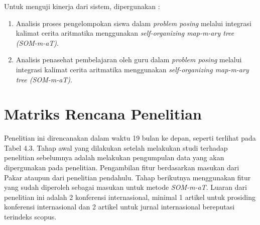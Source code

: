 Untuk menguji kinerja dari sistem, dipergunakan :

\begin{enumerate}
    \item Analisis proses pengelompokan siswa dalam \textit{problem posing} melalui integrasi kalimat cerita aritmatika menggunakan \textit{self-organizing map-m-ary tree (SOM-m-aT)}.
    \item Analisis penasehat pembelajaran oleh guru dalam \textit{problem posing} melalui integrasi kalimat cerita aritmatika menggunakan \textit{self-organizing map-m-ary tree (SOM-m-aT)}.
\end{enumerate}

\section{Matriks Rencana Penelitian}

Penelitian ini direncanakan dalam waktu 19 bulan ke depan, seperti terlihat pada Tabel 4.3. Tahap awal yang dilakukan setelah melakukan studi terhadap penelitian sebelumnya adalah melakukan pengumpulan data yang akan dipergunakan pada penelitian. Pengambilan fitur berdasarkan masukan dari Pakar ataupun dari penelitian pendahulu. Tahap berikutnya menggunakan fitur yang sudah diperoleh sebagai masukan untuk metode \textit{SOM-m-aT}. Luaran dari penelitian ini adalah 2 konferensi internasional, minimal 1 artikel untuk prosiding konferensi internasional dan 2 artikel untuk jurnal internasional bereputasi terindeks scopus.

